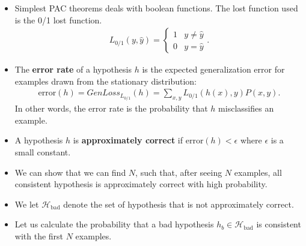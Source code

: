 \documentclass[10pt]{article}
\begin{document}
\begin{itemize}
    \item Simplest PAC theorems deals with boolean functions.
        The lost function used is the 0/1 lost function.
        \begin{align*}
            L_{0/1}(y,\hat{y}) = \begin{cases}
                1 & y \neq \hat{y}\\
                0 & y = \hat{y}
            \end{cases}.
        \end{align*}
    
    \item The {\bf error rate} of a hypothesis $h$ is the 
        expected generalization error for examples drawn
        from the stationary distribution:
        \begin{align*}
            \mathrm{error}(h) = GenLoss_{L_{0/1}}(h)
            = \sum_{x,y} L_{0/1}(h(x),y) P(x,y).
        \end{align*}
        In other words, the error rate is the probability
        that $h$ misclassifies an example.
        
    \item A hypothesis $h$ is {\bf approximately correct}
        if $\mathrm{error}(h) < \epsilon$ where $\epsilon$
        is a small constant.
        
    \item We can show that we can find $N$, such that,
        after seeing $N$ examples, all consistent hypothesis
        is approximately correct with high probability.
        
    \item We let $\mathcal{H}_{\mathrm{bad}}$ denote the
        set of hypothesis that is not approximately correct.
        
    \item Let us calculate the probability that a bad hypothesis
        $h_b \in \mathcal{H}_{\mathrm{bad}}$ is consistent with 
        the first $N$ examples.
        

\end{itemize}
\end{document}
